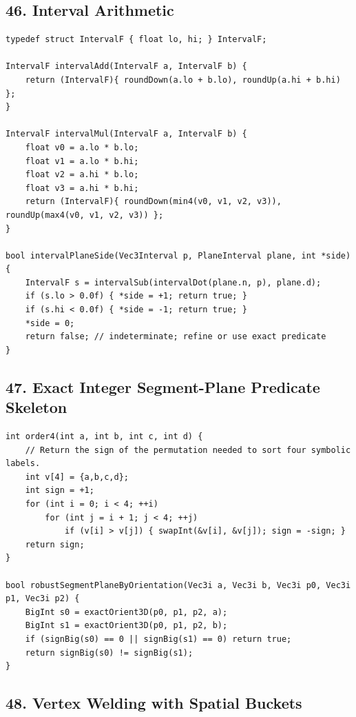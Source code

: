 \documentclass[10pt,letterpaper]{article}
\begin{document}
\subsection*{46. Interval Arithmetic}

\begin{verbatim}
typedef struct IntervalF { float lo, hi; } IntervalF;

IntervalF intervalAdd(IntervalF a, IntervalF b) {
    return (IntervalF){ roundDown(a.lo + b.lo), roundUp(a.hi + b.hi) };
}

IntervalF intervalMul(IntervalF a, IntervalF b) {
    float v0 = a.lo * b.lo;
    float v1 = a.lo * b.hi;
    float v2 = a.hi * b.lo;
    float v3 = a.hi * b.hi;
    return (IntervalF){ roundDown(min4(v0, v1, v2, v3)), roundUp(max4(v0, v1, v2, v3)) };
}

bool intervalPlaneSide(Vec3Interval p, PlaneInterval plane, int *side) {
    IntervalF s = intervalSub(intervalDot(plane.n, p), plane.d);
    if (s.lo > 0.0f) { *side = +1; return true; }
    if (s.hi < 0.0f) { *side = -1; return true; }
    *side = 0;
    return false; // indeterminate; refine or use exact predicate
}
\end{verbatim}


\subsection*{47. Exact Integer Segment-Plane Predicate Skeleton}

\begin{verbatim}
int order4(int a, int b, int c, int d) {
    // Return the sign of the permutation needed to sort four symbolic labels.
    int v[4] = {a,b,c,d};
    int sign = +1;
    for (int i = 0; i < 4; ++i)
        for (int j = i + 1; j < 4; ++j)
            if (v[i] > v[j]) { swapInt(&v[i], &v[j]); sign = -sign; }
    return sign;
}

bool robustSegmentPlaneByOrientation(Vec3i a, Vec3i b, Vec3i p0, Vec3i p1, Vec3i p2) {
    BigInt s0 = exactOrient3D(p0, p1, p2, a);
    BigInt s1 = exactOrient3D(p0, p1, p2, b);
    if (signBig(s0) == 0 || signBig(s1) == 0) return true;
    return signBig(s0) != signBig(s1);
}
\end{verbatim}


\subsection*{48. Vertex Welding with Spatial Buckets}
\end{document}
